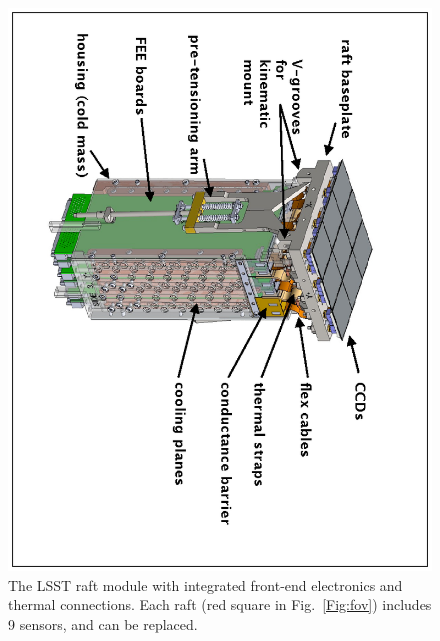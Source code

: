 \documentclass{emulateapj}
\begin{document}
\begin{figure}[ht]
\hskip -1.6in
\includegraphics[width=1.5\hsize,angle=90.0,clip]{raft.ps}
\vskip -2.5in
\caption{The LSST raft module with integrated front-end electronics
and thermal connections. Each raft (red square in Fig.~\ref{Fig:fov})
includes 9 sensors, and can be replaced.} 
\label{Fig:raft}
\end{figure}
\end{document}
